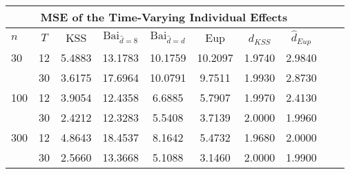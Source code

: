 \begin{tabular}{lccccccccc} 
\hline \multicolumn{8}{c}{MSE of the Time-Varying Individual Effects} \\ \hline 
$n$ & $T$ & KSS & $ \text{Bai}_{\hat{d} = 8}$ & $\text{Bai}_{\hat{d} = d}$ & Eup & $\hat{d}_{KSS}$ & $\hat{d}_{Eup}$ \\
\hline
30 & 12 &  5.4883  &  13.1783  &  10.1759  &  10.2097  &  1.9740  &  2.9840  \\
& 30 &  3.6175  &  17.6964  &  10.0791  &  9.7511  &  1.9930  &  2.8730  \\
100 & 12 &  3.9054  &  12.4358  &  6.6885  &  5.7907  &  1.9970  &  2.4130  \\
& 30 &  2.4212  &  12.3283  &  5.5408  &  3.7139  &  2.0000  &  1.9960  \\
300 & 12 &  4.8643  &  18.4537  &  8.1642  &  5.4732  &  1.9680  &  2.0000  \\
& 30 &  2.5660  &  13.3668  &  5.1088  &  3.1460  &  2.0000  &  1.9900  \\
\end{tabular} 
